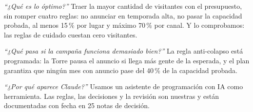 \begin{teprofe}
\emph{``¿Qué es lo óptimo?''} Traer la mayor cantidad de visitantes con el presupuesto, sin romper cuatro reglas: no anunciar
en temporada alta, no pasar la capacidad probada, al menos 15\,\% por lugar y máximo 70\,\% por canal. Y lo comprobamos: las
reglas de cuidado cuestan cero visitantes.
\end{teprofe}

\begin{teprofe}
\emph{``¿Qué pasa si la campaña funciona demasiado bien?''} La regla anti-colapso está programada: la Torre pausa el anuncio
si llega más gente de la esperada, y el plan garantiza que ningún mes con anuncio pase del 40\,\% de la capacidad probada.
\end{teprofe}

\begin{teprofe}
\emph{``¿Por qué aparece Claude?''} Usamos un asistente de programación con IA como herramienta. Las reglas, las decisiones y
la revisión son nuestras y están documentadas con fecha en 25 notas de decisión.
\end{teprofe}

